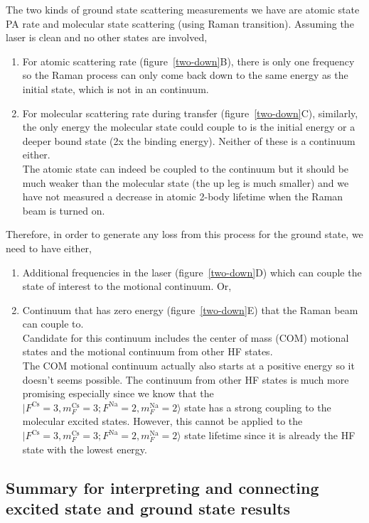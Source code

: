 \documentclass[10pt,fleqn]{article}
\begin{document}
The two kinds of ground state scattering measurements we have are atomic state PA rate
and molecular state scattering (using Raman transition).
Assuming the laser is clean and no other states are involved,
\begin{enumerate}
\item For atomic scattering rate (\mbox{figure \ref{two-down}B}), there is only
  one frequency so the Raman process can only come back down to the same energy as
  the initial state, which is not in an continuum.
\item For molecular scattering rate during transfer (\mbox{figure \ref{two-down}C}),
  similarly, the only energy the molecular state could couple to is the initial energy
  or a deeper bound state (2x the binding energy). Neither of these is a continuum either.\\
  The atomic state can indeed be coupled to the continuum but it should be much weaker than
  the molecular state (the up leg is much smaller) and we have not measured a decrease in
  atomic 2-body lifetime when the Raman beam is turned on.
\end{enumerate}
Therefore, in order to generate any loss from this process for the ground state,
we need to have either,
\begin{enumerate}
\item Additional frequencies in the laser (\mbox{figure \ref{two-down}D}) which
  can couple the state of interest to the motional continuum. Or,
\item Continuum that has zero energy (\mbox{figure \ref{two-down}E}) that the Raman beam
  can couple to.\\
  Candidate for this continuum includes the center of mass (COM) motional states and
  the motional continuum from other HF states.\\
  The COM motional continuum actually also starts at a positive energy so it doesn't seems
  possible. The continuum from other HF states is much more promising especially since
  we know that the $|F^{\mathrm{Cs}}\!=\!3, m_{F}^{\mathrm{Cs}}\!=\!3; F^{\mathrm{Na}}\!=\!2, m_{F}^{\mathrm{Na}}\!=\!2\rangle$ state has a strong coupling to the molecular excited states.
  However, this cannot be applied to the $|F^{\mathrm{Cs}}\!=\!3, m_{F}^{\mathrm{Cs}}\!=\!3; F^{\mathrm{Na}}\!=\!2, m_{F}^{\mathrm{Na}}\!=\!2\rangle$ state lifetime since it is already
  the HF state with the lowest energy.
\end{enumerate}

\subsection{Summary for interpreting and connecting excited state and ground state results}
\end{document}
